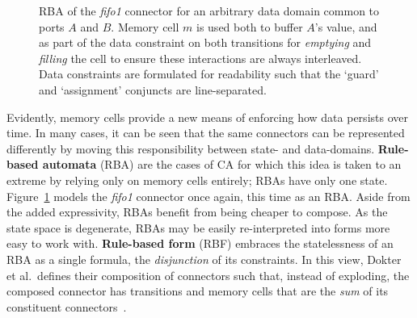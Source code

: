 \begin{figure}[ht]
	\centering
	\caption[RBA for fifo1 connector.]{RBA of the \textit{fifo1} connector for an arbitrary data domain common to ports $A$ and $B$. Memory cell $m$ is used both to buffer $A$'s value, and as part of the data constraint on both transitions for \textit{emptying} and \textit{filling} the cell to ensure these interactions are always interleaved. Data constraints are formulated for readability such that the `guard' and `assignment' conjuncts are line-separated.}
	\label{fig:fifo1_rba}
\end{figure}
Evidently, memory cells provide a new means of enforcing how data persists over time. In many cases, it can be seen that the same connectors can be represented differently by moving this responsibility between state- and data-domains. \textbf{Rule-based automata} (RBA) are the cases of CA for which this idea is taken to an extreme by relying only on memory cells entirely; RBAs have only one state. Figure~\ref{fig:fifo1_rba} models the \textit{fifo1} connector once again, this time as an RBA. Aside from the added expressivity, RBAs benefit from being cheaper to compose. As the state space is degenerate, RBAs may be easily re-interpreted into forms more easy to work with. \textbf{Rule-based form} (RBF) embraces the statelessness of an RBA as a single formula, the \textit{disjunction} of its constraints. In this view, Dokter et al.\ defines their composition of connectors such that, instead of exploding, the composed connector has transitions and memory cells that are the \textit{sum} of its constituent connectors~\cite{dokter2018rule}.



